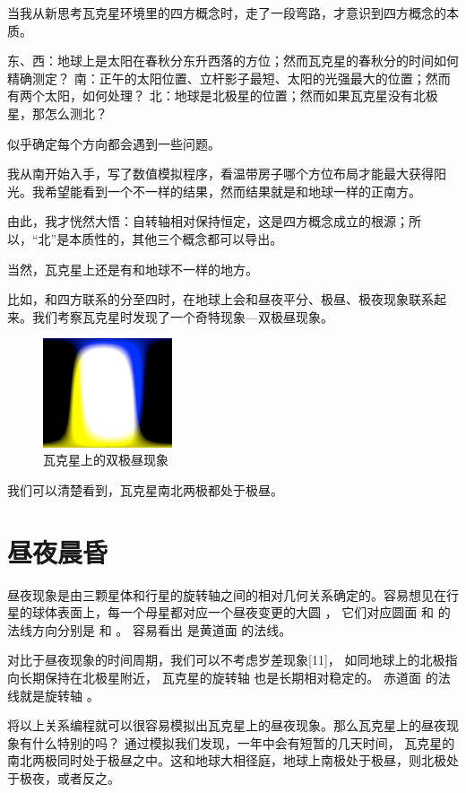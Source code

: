 \documentclass[a4paper,10.5pt]{book}
\begin{document}
当我从新思考瓦克星环境里的四方概念时，走了一段弯路，才意识到四方概念的本质。

东、西：地球上是太阳在春秋分东升西落的方位；然而瓦克星的春秋分的时间如何精确测定？
南：正午的太阳位置、立杆影子最短、太阳的光强最大的位置；然而有两个太阳，如何处理？
北：地球是北极星的位置；然而如果瓦克星没有北极星，那怎么测北？

似乎确定每个方向都会遇到一些问题。

我从南开始入手，写了数值模拟程序，看温带房子哪个方位布局才能最大获得阳光。我希望能看到一个不一样的结果，然而结果就是和地球一样的正南方。

由此，我才恍然大悟：自转轴相对保持恒定，这是四方概念成立的根源；所以，“北”是本质性的，其他三个概念都可以导出。

当然，瓦克星上还是有和地球不一样的地方。

比如，和四方联系的分至四时，在地球上会和昼夜平分、极昼、极夜现象联系起来。我们考察瓦克星时发现了一个奇特现象—双极昼现象。

\begin{figure}[ht]
\centering
\includegraphics[width=1.5in]{images/4_02-day-night.png}
\caption{瓦克星上的双极昼现象}
\end{figure}

我们可以清楚看到，瓦克星南北两极都处于极昼。

\section{昼夜晨昏}

昼夜现象是由三颗星体和行星的旋转轴之间的相对几何关系确定的。容易想见在行星的球体表面上，每一个母星都对应一个昼夜变更的大圆 ，
它们对应圆面   和   的法线方向分别是    和   。 容易看出   是黄道面   的法线。

对比于昼夜现象的时间周期，我们可以不考虑岁差现象[11]， 如同地球上的北极指向长期保持在北极星附近， 瓦克星的旋转轴  也是长期相对稳定的。
赤道面   的法线就是旋转轴  。

将以上关系编程就可以很容易模拟出瓦克星上的昼夜现象。那么瓦克星上的昼夜现象有什么特别的吗？ 通过模拟我们发现，一年中会有短暂的几天时间，
瓦克星的南北两极同时处于极昼之中。这和地球大相径庭，地球上南极处于极昼，则北极处于极夜，或者反之。
\end{document}
